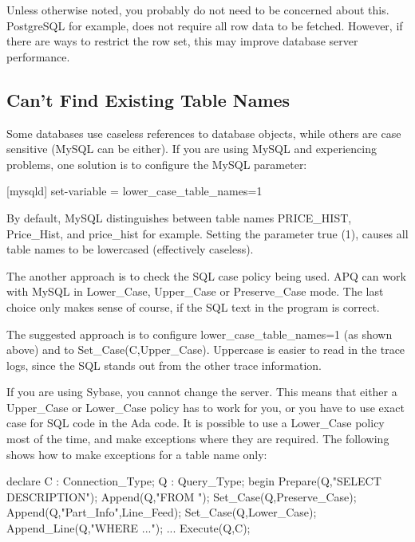 \documentclass[english,letterpaper]{book}
\begin{document}
Unless otherwise noted, you probably do not need to be concerned about
this. PostgreSQL for example, does not require all row data to be
fetched. However, if there are ways to restrict the row set, this
may improve database server performance.


\subsection{Can't Find Existing Table Names}

Some databases use caseless references to database objects, while
others are case sensitive (MySQL can be either). If you are using
MySQL and experiencing problems, one solution is to configure the MySQL parameter:

\begin{Code}

   [mysqld]
   set-variable = lower_case_table_names=1

\end{Code}

By default, MySQL distinguishes
between table names PRICE\_HIST, Price\_Hist, and price\_hist for
example. Setting the parameter true (1), causes all table names
to be lowercased (effectively caseless).

The another approach is to check the SQL case policy being used. APQ
can work with MySQL in Lower\_Case, Upper\_Case or Preserve\_Case
mode. The last choice only makes sense of course, if the SQL text
in the program is correct.

The suggested approach is to configure lower\_case\_table\_names=1
(as shown above) and to Set\_Case(C,Upper\_Case). Uppercase is easier
to read in the trace logs, since the SQL stands out from the other trace
information.

If you are using Sybase, you cannot change the server. This means
that either a Upper\_Case or Lower\_Case policy has to work for you,
or you have to use exact case for SQL code in the Ada code. It is
possible to use a Lower\_Case policy most of the time, and make exceptions
where they are required. The following shows how to make exceptions
for a table name only:

\begin{Example}
declare
   C : Connection_Type;
   Q : Query_Type;
begin
   Prepare(Q,"SELECT DESCRIPTION");
   Append(Q,"FROM ");
   Set_Case(Q,Preserve_Case);
   Append(Q,"Part_Info",Line_Feed);
   Set_Case(Q,Lower_Case);
   Append_Line(Q,"WHERE ...");
   ...
   Execute(Q,C);
\end{Example}
\end{document}
